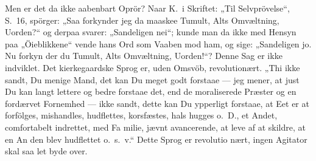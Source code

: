 \documentclass[12pt,a4paper]{article}
\newcommand{\opage}[1]{\marginnote{\footnotesize\textit{[#1]}}}
\begin{document}
Men er det da ikke aabenbart Oprör? Naar K.\ i
Skriftet: „Til Selvprövelse“, S.\ 16, spörger: „Saa forkynder
jeg da maaskee Tumult, Alts Omvæltning, Uorden?“ og
derpaa svarer: „Sandeligen nei“; kunde man da ikke
med Hensyn paa „Öieblikkene“ vende hans Ord som
Vaaben mod ham, og sige: „Sandeligen jo. Nu forkyn\-%
der du Tumult, Alts Omvæltning, Uorden!“? Denne Sag
er ikke indviklet. Det kierkegaardske Sprog er, uden
Omsvöb, revolutionært. „Thi ikke sandt, Du menige
Mand, det kan Du meget godt forstaae --- jeg mener, at
just Du kan langt lettere og bedre forstaae det, end de\-%
moraliserede Præster og en fordærvet Fornemhed ---
ikke sandt, dette kan Du ypperligt forstaae, at Eet er
at forfölges, mishandles, hudflettes, korsfæstes, hals\-%
\opage{28}hugges o.\ D., et Andet, comfortabelt indrettet, med Fa\-%
milie, jævnt avancerende, at leve af at skildre, at en An\-%
den blev hudflettet o.\ s.\ v.“ Dette Sprog er revolutio\-%
nært, ingen Agitator skal saa let byde over.
\end{document}
